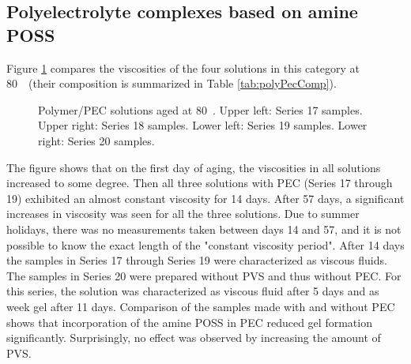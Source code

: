 \subsection{Polyelectrolyte complexes based on amine POSS}
Figure \ref{cht:s17visc80} compares the viscosities of the four solutions in this category at 80~\celsius~(their composition is summarized in Table \ref{tab:polyPecComp}).

\begin{figure}
    \centering
    \caption{Polymer/PEC solutions aged at 80~\celsius. Upper left: Series 17 samples. Upper right: Series 18 samples. Lower left: Series 19 samples. Lower right: Series 20 samples.}
    \label{cht:s17visc80}
\end{figure}

The figure shows that on the first day of aging, the viscosities in all solutions increased to some degree. Then all three solutions with PEC (Series 17 through 19) exhibited an almost constant viscosity for 14 days. After 57 days, a significant increases in viscosity was seen for all the three solutions. Due to summer holidays, there was no measurements taken between days 14 and 57, and it is not possible to know the exact length of the "constant viscosity period". After 14 days the samples in Series 17 through Series 19 were characterized as viscous fluids. The samples in Series 20 were prepared without PVS and thus without PEC. For this series, the solution was characterized as viscous fluid after 5 days and as week gel after 11 days. Comparison of the samples made with and without PEC shows that incorporation of the amine POSS in PEC reduced gel formation significantly. Surprisingly, no effect was observed by increasing the amount of PVS.

